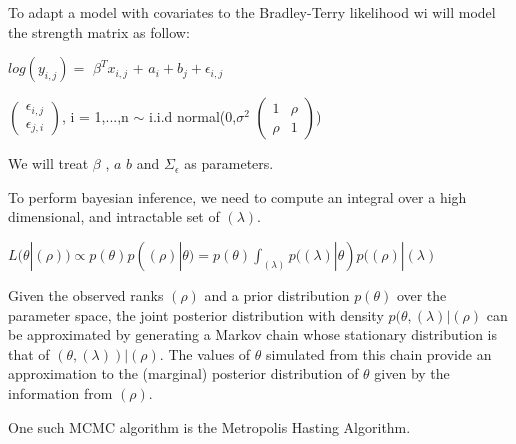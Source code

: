 \documentclass[12pt]{ociamthesis}  %
\begin{document}
	To adapt a model with covariates to the Bradley-Terry likelihood wi will model the strength matrix as follow:
	
	$log(y_{i,j}) = $ \boldmath $\beta^{T} {x_{i,j}}$ \unboldmath + $a_{i} + b_{j} + \epsilon_{i,j}$
	
	\(
	\begin{pmatrix}
	\epsilon_{i,j} \\
	\epsilon_{j,i}
	\end{pmatrix}
	\), i = 1,...,n $\sim $ i.i.d normal(0,$\sigma^{2}$ $\begin{pmatrix} 1 & \rho \\ \rho & 1 \end{pmatrix}$)
	
	
	We will treat \boldmath $\beta$ \unboldmath, \boldmath $a$ \unboldmath \boldmath $b$ \unboldmath and $\Sigma_{\epsilon}$ as parameters.
	
	To perform bayesian inference, we need to compute an integral over a high dimensional, and intractable set of $(\lambda)$.
	
	$L(\theta | (\rho)) \propto p(\theta)p((\rho) | \theta) = p(\theta)\int_{(\lambda)}p((\lambda) | \theta)p((\rho) | (\lambda)  $
	
	
	Given the observed ranks $(\rho)$ and a prior distribution $p(\theta)$ over the parameter space, the joint posterior distribution with density $p(\theta, (\lambda)|(\rho)$ can be approximated by generating a Markov chain whose stationary distribution is that of $(\theta, (\lambda)) | (\rho)$. The values of $\theta$ simulated from this chain provide an approximation to the (marginal) posterior distribution of $\theta$ given by the information from $(\rho)$.
	
	One such MCMC algorithm is the Metropolis Hasting Algorithm.
	
\end{document}
